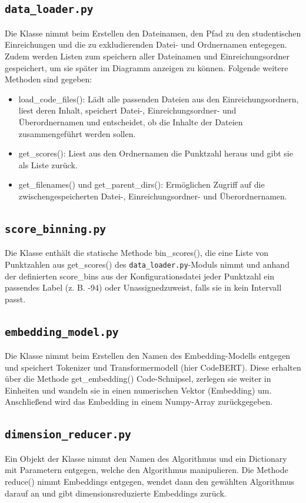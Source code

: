 \subsection{\texttt{data\_loader.py}}
\label{abs:data-loader}
Die Klasse nimmt beim Erstellen den Dateinamen, den Pfad zu den studentischen Einreichungen und die zu exkludierenden Datei- und Ordnernamen entegegen. Zudem werden Listen zum speichern aller Dateinamen und Einreichungsordner gespeichert, um sie später im Diagramm anzeigen zu können. Folgende weitere Methoden sind gegeben:
\begin{itemize}
	\item load\_code\_files(): Lädt alle passenden Dateien aus den Einreichungsordnern, liest deren Inhalt, speichert Datei-, Einreichungsordner- und Überordnernamen und entscheidet, ob die Inhalte der Dateien zusammengeführt werden sollen.
	\item get\_scores(): Liest aus den Ordnernamen die Punktzahl heraus und gibt sie als Liste zurück.
	\item get\_filenames() und get\_parent\_dirs(): Ermöglichen Zugriff auf die zwischengespeicherten Datei-, Einreichungsordner- und Überordnernamen.
\end{itemize}


\subsection{\texttt{score\_binning.py}}
\label{abs:score-binning}
Die Klasse enthält die statische Methode bin\_scores(), die eine Liste von Punktzahlen aus get\_scores() des \texttt{data\_loader.py}-Moduls nimmt und anhand der definierten score\_bins aus der Konfigurationsdatei jeder Punktzahl ein passendes Label (z. B. -94\grqq) oder \glqq Unassigned\grqq zuweist, falls sie in kein Intervall passt.


\subsection{\texttt{embedding\_model.py}}
\label{abs:embedding-model}
Die Klasse nimmt beim Erstellen den Namen des Embedding-Modells entgegen und speichert Tokenizer und Transformermodell (hier CodeBERT). Diese erhalten über die Methode get\_embedding() Code-Schnipsel, zerlegen sie weiter in Einheiten und wandeln sie in einen numerischen Vektor (Embedding) um. Anschließend wird das Embedding in einem Numpy-Array zurückgegeben.


\subsection{\texttt{dimension\_reducer.py}}
\label{abs:dimension-reducer}
Ein Objekt der Klasse nimmt den Namen des Algorithmus und ein Dictionary mit Parametern entgegen, welche den Algorithmus manipulieren. Die Methode reduce() nimmt Embeddings entgegen, wendet dann den gewählten Algorithmus darauf an und gibt dimensionsreduzierte Embeddings zurück.


